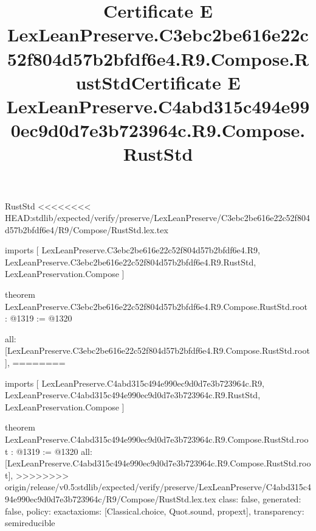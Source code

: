 \begin{lexlean}{RustStd}
<<<<<<<< HEAD:stdlib/expected/verify/preserve/LexLeanPreserve/C3ebc2be616e22c52f804d57b2bfdf6e4/R9/Compose/RustStd.lex.tex
\title{Certificate E LexLeanPreserve.C3ebc2be616e22c52f804d57b2bfdf6e4.R9.Compose.RustStd}
\begin{coremodule}
imports [
  LexLeanPreserve.C3ebc2be616e22c52f804d57b2bfdf6e4.R9,
  LexLeanPreserve.C3ebc2be616e22c52f804d57b2bfdf6e4.R9.RustStd,
  LexLeanPreservation.Compose
]

theorem LexLeanPreserve.C3ebc2be616e22c52f804d57b2bfdf6e4.R9.Compose.RustStd.root : @1319 := @1320 {
  all: [LexLeanPreserve.C3ebc2be616e22c52f804d57b2bfdf6e4.R9.Compose.RustStd.root],
========
\title{Certificate E LexLeanPreserve.C4abd315c494e990ec9d0d7e3b723964c.R9.Compose.RustStd}
\begin{coremodule}
imports [
  LexLeanPreserve.C4abd315c494e990ec9d0d7e3b723964c.R9,
  LexLeanPreserve.C4abd315c494e990ec9d0d7e3b723964c.R9.RustStd,
  LexLeanPreservation.Compose
]

theorem LexLeanPreserve.C4abd315c494e990ec9d0d7e3b723964c.R9.Compose.RustStd.root : @1319 := @1320 {
  all: [LexLeanPreserve.C4abd315c494e990ec9d0d7e3b723964c.R9.Compose.RustStd.root],
>>>>>>>> origin/release/v0.5:stdlib/expected/verify/preserve/LexLeanPreserve/C4abd315c494e990ec9d0d7e3b723964c/R9/Compose/RustStd.lex.tex
  class: false,
  generated: false,
  policy: exact{axioms: [Classical.choice, Quot.sound, propext]},
  transparency: semireducible
}


\end{coremodule}}
\end{coremodule}
\end{lexlean}
